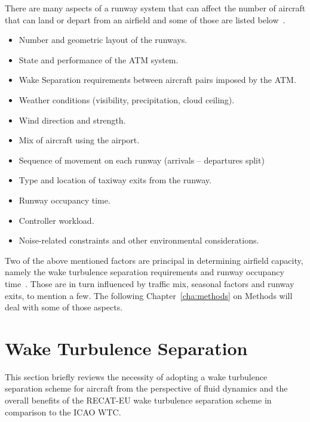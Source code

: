 There are many aspects of a runway system that can affect the number of aircraft that can land or depart from an airfield and some of those are listed below~\cite{de_neufville_airport_2013, kim_validation_2010}.
\begin{itemize}
    \item Number and geometric layout of the runways.
    \item State and performance of the ATM system.
    \item Wake Separation requirements between aircraft pairs imposed by the ATM.
    \item Weather conditions (visibility, precipitation, cloud ceiling). 
    \item Wind direction and strength.
    \item Mix of aircraft using the airport.
    \item Sequence of movement on each runway (arrivals -- departures split)
    \item Type and location of taxiway exits from the runway.
    \item Runway occupancy time.
    \item Controller workload.
    \item Noise-related constraints and other environmental considerations.
\end{itemize}

Two of the above mentioned factors are principal in determining airfield capacity, namely the wake turbulence separation requirements and runway occupancy time~\cite{kolos2013influence}. Those are in turn influenced by traffic mix, seasonal factors and runway exits, to mention a few. The following Chapter~\ref{cha:methods} on Methods will deal with some of those aspects. 


\section{Wake Turbulence Separation}
This section briefly reviews the necessity of adopting a wake turbulence separation scheme for aircraft from the perspective of fluid dynamics and the overall benefits of the RECAT-EU wake turbulence separation scheme in comparison to the ICAO WTC.

